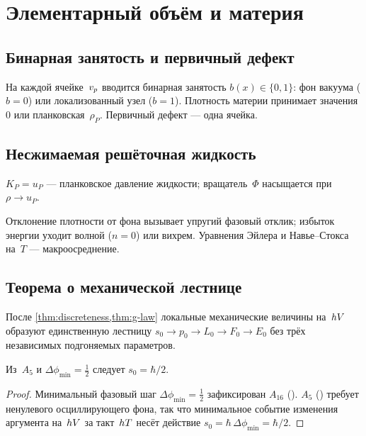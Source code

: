 \chapter{Элементарный объём и материя}
\label{ch:matter}

\section{Бинарная занятость и первичный дефект}

На каждой ячейке~$v_p$ вводится бинарная занятость $b(x)\in\{0,1\}$:
фон вакуума ($b=0$) или локализованный узел ($b=1$).
Плотность материи принимает значения $0$ или планковская~$\rho_P$.
Первичный дефект --- одна ячейка.

\section{Несжимаемая решёточная жидкость}

\begin{definition}
\label{def:kp}
$K_P=u_P$ --- планковское давление жидкости;
вращатель~$\Phi$ насыщается при $\rho\to u_P$.
\end{definition}

Отклонение плотности от фона вызывает упругий фазовый отклик;
избыток энергии уходит волной ($n=0$) или вихрем.
Уравнения Эйлера и Навье--Стокса на~$T$ --- макроосреднение.

\section{Теорема о механической лестнице}
\label{sec:theorem-51}

\begin{theorem}
\label{thm:51}
После \cref{thm:discreteness,thm:g-law} локальные механические величины на~$hV$ образуют
единственную лестницу $s_0\to p_0\to L_0\to F_0\to E_0$
без трёх независимых подгоняемых параметров.
\end{theorem}

\begin{lemma}[5.1a]
\label{lem:51a}
Из~$A_5$ и $\Delta\phi_{\min}=\tfrac12$ следует $s_0=\hbar/2$.
\end{lemma}

\begin{proof}
Минимальный фазовый шаг $\Delta\phi_{\min}=\tfrac12$ зафиксирован $A_{16}$ ().
$A_5$ () требует ненулевого осциллирующего фона, так что минимальное
событие изменения аргумента на~$hV$ за такт~$hT$ несёт действие
$s_0=\hbar\,\Delta\phi_{\min}=\hbar/2$.
\end{proof}

